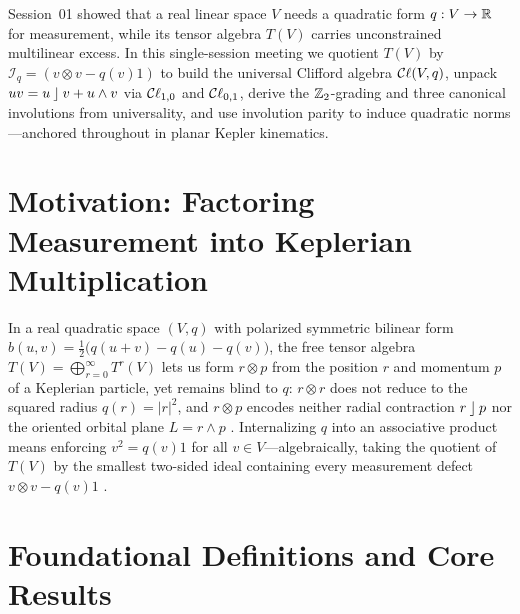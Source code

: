 \documentclass[11pt,a4paper]{article}
\begin{document}
\makeseminarheader

\begin{seminarabstract}
  Session~01 showed that a real linear space $V$ needs a quadratic form
  $q : V \to \mathbb{R}$ for measurement, while its tensor algebra $T(V)$ carries
  unconstrained multilinear excess.
  In this single-session meeting we quotient $T(V)$ by
  $\mathcal{I}_q = ( v \otimes v - q(v)1 )$ to build the universal
  Clifford algebra $\mathcal{C}\ell(V,q)$, unpack $uv = u \mathbin{\rfloor} v + u \wedge v$ via
  $\mathcal{C}\ell_{1,0}$ and $\mathcal{C}\ell_{0,1}$, derive the $\mathbb{Z}_2$-grading and three canonical
  involutions from universality, and use involution parity to induce quadratic
  norms---anchored throughout in planar Kepler kinematics.
\end{seminarabstract}

\section{Motivation: Factoring Measurement into Keplerian Multiplication}
\label{sec:motivation}

In a real quadratic space $(V, q)$ with polarized symmetric bilinear form
$b(u, v) = \tfrac{1}{2}\bigl(q(u + v) - q(u) - q(v)\bigr)$, the free tensor
algebra $T(V) = \bigoplus_{r=0}^{\infty} T^r(V)$ lets us form $r \otimes p$
from the position $r$ and momentum $p$ of a Keplerian particle, yet remains
blind to $q$: $r \otimes r$ does not reduce to the squared radius $q(r) =
|r|^2$, and $r \otimes p$ encodes neither radial contraction $r \mathbin{\rfloor} p$ nor the
oriented orbital plane $L = r \wedge p$
\cite{hestenesNewFoundationsClassical2002,doranGeometricAlgebraPhysicists2013}.
Internalizing $q$ into an associative product means enforcing $v^2 = q(v) 1$
for all $v \in V$---algebraically, taking the quotient of $T(V)$ by the
smallest two-sided ideal containing every measurement defect
$v \otimes v - q(v)1$ \cite{vazIntroductionCliffordAlgebras2016,
garlingCliffordAlgebrasIntroduction2011}.

\section{Foundational Definitions and Core Results}
\label{sec:definitions}
\end{document}
